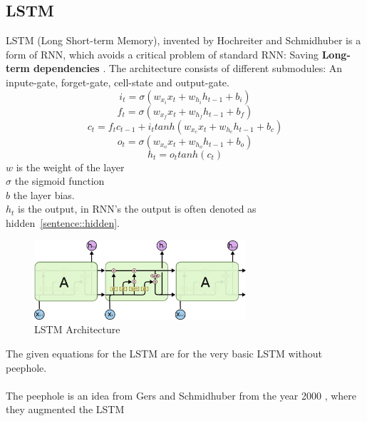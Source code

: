  \subsection{LSTM} \label{subsection::lstm}
  LSTM (Long Short-term Memory), invented by Hochreiter and Schmidhuber \cite{Hochreiter1997} is a form of RNN, which avoids a critical problem of standard RNN: Saving 
  \textbf{Long-term dependencies} 
  \cite{Goodfellow2016}.
  The architecture consists of different submodules: An inpute-gate, forget-gate, cell-state and output-gate.
  \begin{equation}
   i_t = \sigma(w_{x_i}x_t + w_{h_i}h_{t-1} + b_i)
  \end{equation}
  \begin{equation}
   f_t = \sigma(w_{x_f}x_t + w_{h_f}h_{t-1} + b_f)
  \end{equation}
  \begin{equation}
   c_t = f_tc_{t-1} + i_ttanh(w_{x_c}x_t + w_{h_c}h_{t-1} + b_c)
  \end{equation}
  \begin{equation}
   o_t = \sigma(w_{x_o}x_t + w_{h_o}h_{t-1} + b_o)
  \end{equation}
  \begin{equation}
   h_t = o_ttanh(c_t)
  \end{equation}
  $w$ is the weight of the layer\\
  $\sigma$ the sigmoid function\\
  $b$ the layer bias.\\
  $h_t$ is the output, in RNN's the output is often denoted as hidden~\ref{sentence::hidden}.
  \begin{figure}[H]
   \includegraphics[width=0.7\textwidth]{../Images/lstm_chain.png}
   \centering
   \caption{LSTM Architecture \cite{Olah2015}}
   \label{fig:lstm_architecture}
  \end{figure}\noindent
  The given equations for the LSTM are for the very basic LSTM without peephole.\\\\
  The peephole is an idea from Gers and Schmidhuber from the year 2000 \cite{Gers2000}, where they augmented the LSTM
